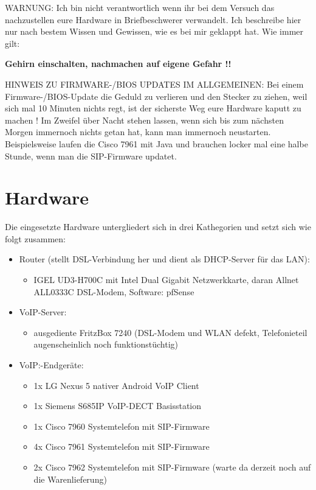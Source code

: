 \documentclass[a4paper,12pt]{scrbook}
\begin{document}
WARNUNG: Ich bin nicht verantwortlich wenn ihr bei dem Versuch das nachzustellen eure Hardware in Briefbeschwerer verwandelt. Ich
beschreibe hier nur nach bestem Wissen und Gewissen, wie es bei mir geklappt hat. Wie immer gilt: 


\textbf{Gehirn einschalten, nachmachen auf eigene Gefahr !!}


HINWEIS ZU FIRMWARE-/BIOS UPDATES IM ALLGEMEINEN: Bei einem Firmware-/BIOS-Update die Geduld zu verlieren und den Stecker zu ziehen,
weil sich mal 10 Minuten nichts regt, ist der sicherste Weg eure Hardware kaputt zu machen ! Im Zweifel über Nacht stehen lassen, wenn
sich bis zum nächsten Morgen immernoch nichts getan hat, kann man immernoch neustarten. Beispielsweise laufen die Cisco 7961 mit Java und
brauchen locker mal eine halbe Stunde, wenn man die SIP-Firmware updatet. 


\chapter{Hardware}
\label{sec:1}

Die eingesetzte Hardware untergliedert sich in drei Kathegorien und setzt sich wie folgt zusammen:

\begin{itemize}
 \item Router (stellt DSL-Verbindung her und dient als DHCP-Server für das LAN):
 \begin{itemize}
  \item IGEL UD3-H700C mit Intel Dual Gigabit Netzwerkkarte, daran Allnet ALL0333C DSL-Modem, Software: pfSense
 \end{itemize}
 \item VoIP-Server: 
 \begin{itemize}
  \item ausgediente FritzBox 7240 (DSL-Modem und WLAN defekt, Telefonieteil augenscheinlich noch funktionstüchtig)
 \end{itemize}
 \item VoIP:-Endgeräte:
 \begin{itemize}
  \item 1x LG Nexus 5 nativer Android VoIP Client
  \item 1x Siemens S685IP VoIP-DECT Basisstation
  \item 1x Cisco 7960 Systemtelefon mit SIP-Firmware
  \item 4x Cisco 7961 Systemtelefon mit SIP-Firmware
  \item 2x Cisco 7962 Systemtelefon mit SIP-Firmware (warte da derzeit noch auf die Warenlieferung)
 \end{itemize}
\end{itemize}
\end{document}
